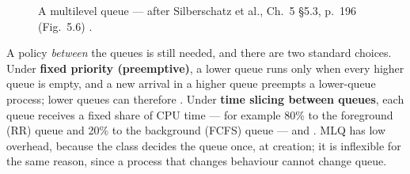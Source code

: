 \documentclass[11pt]{article}
\begin{document}
\begin{figure}[h]
\centering
\caption{A multilevel queue --- after Silberschatz et al., Ch.~5 \S5.3, p.~196 (Fig.~5.6) \cite{SilberschatzOSC_operating_system_concepts}.}
\label{fig:mlq}
\end{figure}

A policy \emph{between} the queues is still needed, and there are two standard choices. Under \textbf{fixed priority (preemptive)}, a lower queue runs only when every higher queue is empty, and a new arrival in a higher queue preempts a lower-queue process; lower queues can therefore . Under \textbf{time slicing between queues}, each queue receives a fixed share of CPU time --- for example 80\% to the foreground (RR) queue and 20\% to the background (FCFS) queue --- and . MLQ has low overhead, because the class decides the queue once, at creation; it is inflexible for the same reason, since a process that changes behaviour cannot change queue.
\end{document}
